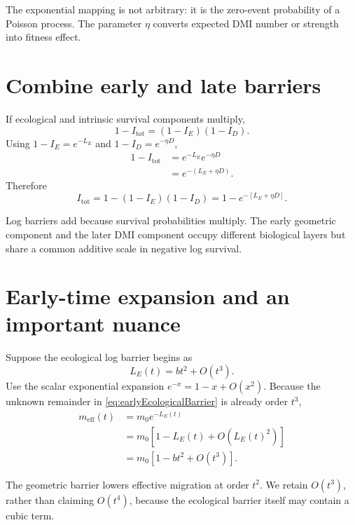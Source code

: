 \inwords The exponential mapping is not arbitrary: it is the zero-event probability of a Poisson process. The parameter \(\eta\) converts expected DMI number or strength into fitness effect.

\section{Combine early and late barriers}

If ecological and intrinsic survival components multiply,
\begin{equation}
1-I_{\mathrm{tot}}
=(1-I_E)(1-I_D).
\end{equation}
Using \(1-I_E=e^{-L_E}\) and \(1-I_D=e^{-\eta D}\),
\begin{align}
1-I_{\mathrm{tot}}
&=e^{-L_E}e^{-\eta D}\\
&=e^{-(L_E+\eta D)}.
\end{align}
Therefore
\begin{equation}
\boxed{
I_{\mathrm{tot}}
=1-(1-I_E)(1-I_D)
=1-e^{-[L_E+\eta D]}.}
\label{eq:combinedBarrier}
\end{equation}

\begin{geombox}
Log barriers add because survival probabilities multiply. The early geometric component and the later DMI component occupy different biological layers but share a common additive scale in negative log survival.
\end{geombox}

\section{Early-time expansion and an important nuance}

Suppose the ecological log barrier begins as
\begin{equation}
L_E(t)=bt^2+O(t^3).
\label{eq:earlyEcologicalBarrier}
\end{equation}
Use the scalar exponential expansion \(e^{-x}=1-x+O(x^2)\). Because the unknown remainder in \cref{eq:earlyEcologicalBarrier} is already order \(t^3\),
\begin{align}
m_{\mathrm{eff}}(t)
&=m_0e^{-L_E(t)}\\
&=m_0\left[1-L_E(t)+O(L_E(t)^2)\right]\\
&=m_0\left[1-bt^2+O(t^3)\right].
\label{eq:earlyEffectiveMigrationExpansion}
\end{align}

\inwords The geometric barrier lowers effective migration at order \(t^2\). We retain \(O(t^3)\), rather than claiming \(O(t^4)\), because the ecological barrier itself may contain a cubic term.


